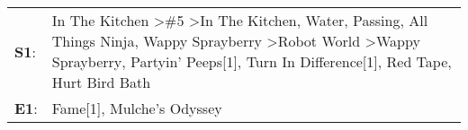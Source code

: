 \begin{supertabular}{p{0.03\textwidth}p{0.92\textwidth}}
 \textbf{S1}:  &  In The Kitchen\textsuperscript{} \textgreater \enspace \#5\textsuperscript{} \textgreater \enspace In The Kitchen\textsuperscript{}, \enspace Water\textsuperscript{}, \enspace Passing\textsuperscript{}, \enspace All Things Ninja\textsuperscript{}, \enspace Wappy Sprayberry\textsuperscript{} \textgreater \enspace Robot World\textsuperscript{} \textgreater \enspace Wappy Sprayberry\textsuperscript{}, \enspace Partyin' Peeps[1]\textsuperscript{}, \enspace Turn In Difference[1]\textsuperscript{}, \enspace Red Tape\textsuperscript{}, \enspace Hurt Bird Bath\textsuperscript{}  \enspace  \\
 \textbf{E1}:  &                                                                                                                                                                                                                                                                                                                                                                                                                                                                                                                            Fame[1]\textsuperscript{}, \enspace Mulche's Odyssey\textsuperscript{}  \enspace  \\
\end{supertabular}
